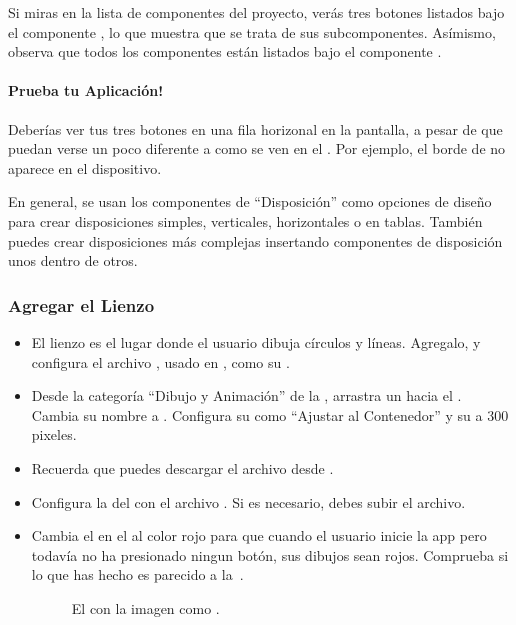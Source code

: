 Si miras en la lista de componentes del proyecto, verás tres botones
listados bajo el componente , lo que
muestra que se trata de sus subcomponentes. Asímismo, observa que
todos los componentes están listados bajo el componente
.

\paragraph{Prueba tu Aplicación!} Deberías ver tus tres botones en una
fila horizonal en la pantalla, a pesar de que puedan verse un poco
diferente a como se ven en el \designer. Por ejemplo, el borde de
 no aparece en el dispositivo.

En general, se usan los componentes de ``Disposición'' como opciones
de diseño para crear disposiciones simples, verticales, horizontales o
en tablas. También puedes crear disposiciones más complejas insertando
componentes de disposición unos dentro de otros.

\subsubsection*{Agregar el Lienzo}

\begin{itemize}

\item El lienzo es el lugar donde el usuario dibuja círculos y
  líneas. Agregalo, y configura el archivo ,
  usado en , como su .

\item Desde la categoría ``Dibujo y Animación'' de la \palette,
  arrastra un  hacia el \viewer. Cambia su nombre a
  . Configura su  como
  ``Ajustar al Contenedor'' y su  a 300 pixeles.

\item Recuerda que puedes descargar el archivo 
  desde .

\item Configura la  del
   con el archivo . Si
  es necesario, debes subir el archivo.

\item Cambia el  en el
   al color rojo para que cuando
  el usuario inicie la app pero todavía no ha presionado ningun botón,
  sus dibujos sean rojos. Comprueba si lo que has hecho es parecido a
  la~.

\begin{figure}[H]
\centering
\caption{El  con la imagen
   como .}
\label{fig:PaintPot3}
\end{figure}

\end{itemize}

